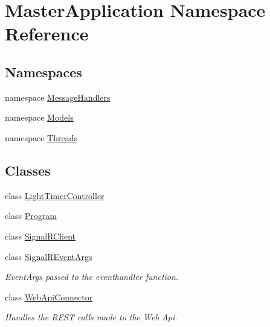 \hypertarget{namespace_master_application}{}\section{Master\+Application Namespace Reference}
\label{namespace_master_application}
\subsection*{Namespaces}
\begin{DoxyCompactItemize}
\item 
namespace \mbox{\hyperlink{namespace_master_application_1_1_message_handlers}{Message\+Handlers}}
\item 
namespace \mbox{\hyperlink{namespace_master_application_1_1_models}{Models}}
\item 
namespace \mbox{\hyperlink{namespace_master_application_1_1_threads}{Threads}}
\end{DoxyCompactItemize}
\subsection*{Classes}
\begin{DoxyCompactItemize}
\item 
class \mbox{\hyperlink{class_master_application_1_1_light_timer_controller}{Light\+Timer\+Controller}}
\item 
class \mbox{\hyperlink{class_master_application_1_1_program}{Program}}
\item 
class \mbox{\hyperlink{class_master_application_1_1_signal_r_client}{Signal\+R\+Client}}
\item 
class \mbox{\hyperlink{class_master_application_1_1_signal_r_event_args}{Signal\+R\+Event\+Args}}
\begin{DoxyCompactList}\small\item\em Event\+Args passed to the eventhandler function. \end{DoxyCompactList}\item 
class \mbox{\hyperlink{class_master_application_1_1_web_api_connector}{Web\+Api\+Connector}}
\begin{DoxyCompactList}\small\item\em Handles the R\+E\+ST calls made to the Web Api. \end{DoxyCompactList}\end{DoxyCompactItemize}
